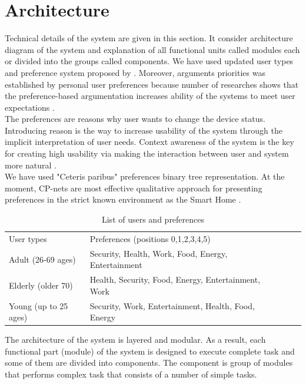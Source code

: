 \documentclass{llncs}
\begin{document}
    \section{Architecture}
    Technical details of the system are given in this section.
    It consider architecture diagram of the system and explanation of all functional units called modules each
    or divided into the groups called components.
    We have used updated user types and preference system proposed by \cite{9}.
    Moreover, arguments priorities was established by personal user preferences \cite{11} because
    number of researches shows that the preference-based argumentation increases ability of the systems to meet user
    expectations \cite{10}.\\
    The preferences are reasons why user wants to change the device status.
    Introducing reason is the way to increase usability of the system through the implicit interpretation of user needs.
    Context awareness of the system is the key for creating high usability via making the interaction
    between user and system more natural \cite{7}.\\
    We have used "Ceteris paribus" preferences binary tree representation.
    At the moment, CP-nets are most effective qualitative approach for presenting preferences in the strict known
    environment as the Smart Home \cite{10}.
    \begin{table}
        \caption{List of users and preferences}
        \begin{tabular}{llllll}
            \hline\noalign{\smallskip}
            User types & Preferences (positions 0,1,2,3,4,5)\\
            \noalign{\smallskip}
            \hline
            \noalign{\smallskip}
            Adult (26-69 ages) & Security, Health, Work, Food, Energy, Entertainment\\
            Elderly (older 70) & Health, Security, Food, Energy, Entertainment, Work\\
            Young (up to 25 ages) & Security, Work, Entertainment, Health, Food, Energy\\
            \hline
        \end{tabular}
    \end{table}
    The architecture of the system is layered and modular.
    As a result, each functional part (module) of the system is designed to execute complete task and some of them are
    divided into components.
    The component is group of modules that performs complex task that consists of a number of simple tasks.
\end{document}
